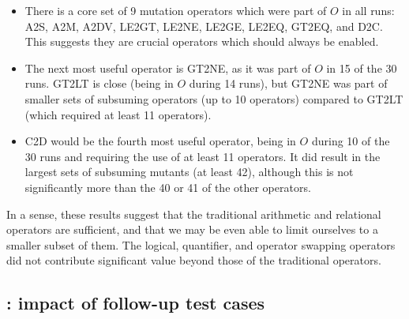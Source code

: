 \begin{itemize}
\item There is a core set of 9 mutation operators which were part of $O$ in all runs: A2S, A2M, A2DV, LE2GT, LE2NE, LE2GE, LE2EQ, GT2EQ, and D2C. This suggests they are crucial operators which should always be enabled.

\item The next most useful operator is GT2NE, as it was part of $O$ in 15 of the 30 runs. GT2LT is close (being in $O$ during 14 runs), but GT2NE was part of smaller sets of subsuming operators (up to 10 operators) compared to GT2LT (which required at least 11 operators).

\item C2D would be the fourth most useful operator, being in $O$ during 10 of the 30 runs and requiring the use of at least 11 operators. It did result in the largest sets of subsuming mutants (at least 42), although this is not significantly more than the 40 or 41 of the other operators.
\end{itemize}

In a sense, these results suggest that the traditional arithmetic and relational operators are sufficient, and that we may be even able to limit ourselves to a smaller subset of them.
The logical, quantifier, and operator swapping operators did not contribute significant value beyond those of the traditional operators.

\subsection{\rqmetamorphic: impact of follow-up test cases}

